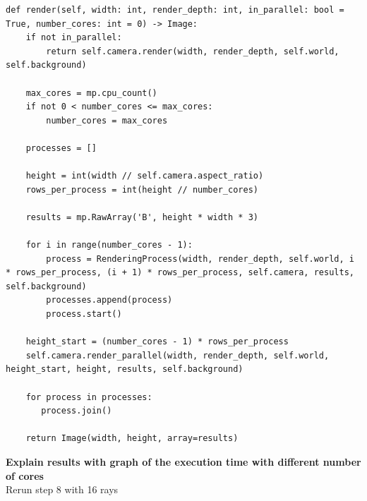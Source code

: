 \documentclass[12pt]{report}
\begin{document}
\newpage
\begin{lstlisting}[caption={Parallelizing the rendering process}, label=lst:parallel, style=mystyle]
def render(self, width: int, render_depth: int, in_parallel: bool = True, number_cores: int = 0) -> Image:
    if not in_parallel:
        return self.camera.render(width, render_depth, self.world, self.background)

    max_cores = mp.cpu_count()
    if not 0 < number_cores <= max_cores:
        number_cores = max_cores

    processes = []
    
    height = int(width // self.camera.aspect_ratio)
    rows_per_process = int(height // number_cores)
    
    results = mp.RawArray('B', height * width * 3)
    
    for i in range(number_cores - 1):
        process = RenderingProcess(width, render_depth, self.world, i * rows_per_process, (i + 1) * rows_per_process, self.camera, results, self.background)
        processes.append(process)
        process.start()

    height_start = (number_cores - 1) * rows_per_process
    self.camera.render_parallel(width, render_depth, self.world, height_start, height, results, self.background)
    
    for process in processes:
       process.join()

    return Image(width, height, array=results)
\end{lstlisting}
\newpage
\noindent \textbf{Explain results with graph of the execution time with different number of cores}\\Rerun step 8 with 16 rays
\end{document}

